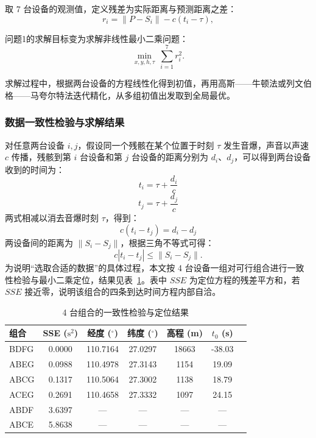 \documentclass[12pt,a4paper]{article}
\begin{document}
取 7 台设备的观测值，定义残差为实际距离与预测距离之差：
\begin{equation}
  r_i=\|P-S_i\|-c(t_i-\tau),
\end{equation}\label{eq2}

问题1的求解目标变为求解非线性最小二乘问题：
\begin{equation}
  \min_{x,y,h,\tau}\ \sum_{i=1}^{7}r_i^2.
\end{equation}\label{eq3}

求解过程中，根据两台设备的方程线性化得到初值，再用高斯——牛顿法或列文伯格——马夸尔特法迭代精化，从多组初值出发取到全局最优。

\subsubsection{数据一致性检验与求解结果}

对任意两台设备 $i,j$，假设同一个残骸在某个位置于时刻 $\tau$ 发生音爆，声音以声速 $c$ 传播，残骸到第 $i$ 台设备和第 $j$ 台设备的距离分别为 $d_i$、$d_j$，可以得到两台设备收到的时间为：
$$t_i=\tau+\frac{d_i}{c}$$
$$t_j=\tau+\frac{d_j}{c}$$
两式相减以消去音爆时刻 $\tau$，得到：
$$c(t_i-t_j)=d_i-d_j$$
两设备间的距离为 $\|S_i-S_j\|$，根据三角不等式可得：
\begin{equation}
  c|t_i-t_j|\le\|S_i-S_j\|.
\end{equation}
为说明“选取合适的数据”的具体过程，本文按 4 台设备一组对可行组合进行一致性检验与最小二乘定位，结果见表~\ref{tab:q1comb}。表中 $SSE$ 为定位方程的残差平方和，若 $SSE$ 接近零，说明该组合的四条到达时间方程内部自洽。

\begin{table}[H]
\centering
\caption{4 台组合的一致性检验与定位结果}
\label{tab:q1comb}
\begin{tabular}{lcccccc}
\toprule
组合 & SSE ($\mathrm{s}^{2}$) & 经度 ($^{\circ}$) & 纬度 ($^{\circ}$) & 高程 (m) & $t_{0}$ (s) \\
\midrule
BDFG & 0.0000 & 110.7164 & 27.0297 & 18663 & -38.03 \\
ABEG & 0.0988 & 110.4978 & 27.3143 & 1154  & 19.09 \\
ABCG & 0.1317 & 110.5064 & 27.3002 & 1138  & 18.79 \\
ACEG & 0.2691 & 110.4658 & 27.3332 & 1097  & 24.15 \\
ABDF & 3.6397 & ---      & ---      & ---   & --- \\
ABCE & 5.8638 & ---      & ---      & ---   & --- \\
\bottomrule
\end{tabular}
\end{table}
\end{document}
